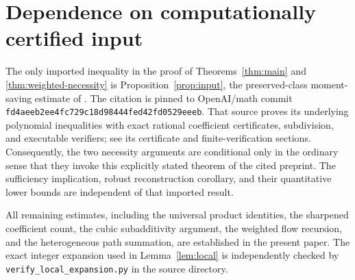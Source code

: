 \section{Dependence on computationally certified input}
\label{sec:provenance}

The only imported inequality in the proof of
Theorems~\ref{thm:main} and \ref{thm:weighted-necessity} is
Proposition~\ref{prop:input}, the preserved-class moment-saving estimate of
\cite[Proposition~3.2]{OAIThreshold}. The citation is pinned to OpenAI/math
commit \texttt{fd4aeeb2ee4fc729c18d98444fed42fd0529eeeb}. That source proves
its underlying polynomial inequalities with exact rational coefficient
certificates, subdivision, and executable verifiers; see its certificate and
finite-verification sections. Consequently, the two necessity arguments are
conditional only in the ordinary sense that they invoke this explicitly
stated theorem of the cited preprint. The sufficiency implication, robust
reconstruction corollary, and their quantitative lower bounds are independent
of that imported result.

All remaining estimates, including the universal product identities, the
sharpened coefficient count, the cubic subadditivity argument, the weighted
flow recursion, and the heterogeneous path summation, are established in the
present paper. The exact integer expansion used in
Lemma~\ref{lem:local} is independently checked by
\texttt{verify\_local\_expansion.py} in the source directory.

